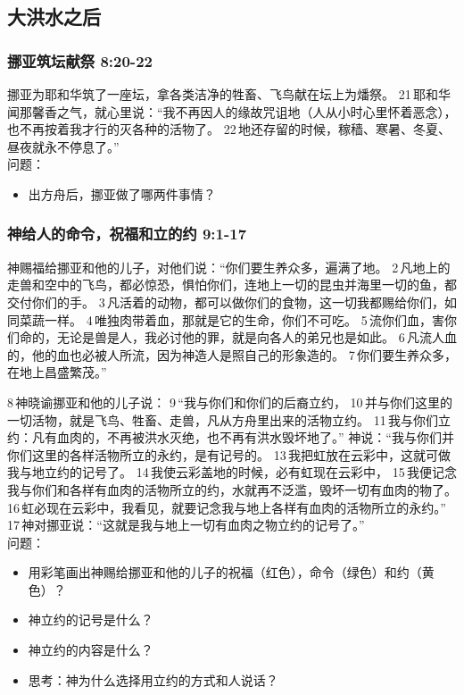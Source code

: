 \subsection{大洪水之后}

\subsubsection{挪亚筑坛献祭 8:20-22}
挪亚为耶和华筑了一座坛，拿各类洁净的牲畜、飞鸟献在坛上为燔祭。 21 耶和华闻那馨香之气，就心里说：“我不再因人的缘故咒诅地（人从小时心里怀着恶念），也不再按着我才行的灭各种的活物了。 22 地还存留的时候，稼穑、寒暑、冬夏、昼夜就永不停息了。”\\

问题：
\begin{itemize}
\item 出方舟后，挪亚做了哪两件事情？
\end{itemize}

\subsubsection{神给人的命令，祝福和立的约 9:1-17}
神赐福给挪亚和他的儿子，对他们说：“你们要生养众多，遍满了地。 2 凡地上的走兽和空中的飞鸟，都必惊恐，惧怕你们，连地上一切的昆虫并海里一切的鱼，都交付你们的手。 3 凡活着的动物，都可以做你们的食物，这一切我都赐给你们，如同菜蔬一样。 4 唯独肉带着血，那就是它的生命，你们不可吃。 5 流你们血，害你们命的，无论是兽是人，我必讨他的罪，就是向各人的弟兄也是如此。 6 凡流人血的，他的血也必被人所流，因为神造人是照自己的形象造的。 7 你们要生养众多，在地上昌盛繁茂。”

8 神晓谕挪亚和他的儿子说： 9 “我与你们和你们的后裔立约， 10 并与你们这里的一切活物，就是飞鸟、牲畜、走兽，凡从方舟里出来的活物立约。 11 我与你们立约：凡有血肉的，不再被洪水灭绝，也不再有洪水毁坏地了。” 神说：“我与你们并你们这里的各样活物所立的永约，是有记号的。 13 我把虹放在云彩中，这就可做我与地立约的记号了。 14 我使云彩盖地的时候，必有虹现在云彩中， 15 我便记念我与你们和各样有血肉的活物所立的约，水就再不泛滥，毁坏一切有血肉的物了。 16 虹必现在云彩中，我看见，就要记念我与地上各样有血肉的活物所立的永约。” 17 神对挪亚说：“这就是我与地上一切有血肉之物立约的记号了。”\\

问题：
\begin{itemize}
\item 用彩笔画出神赐给挪亚和他的儿子的祝福（红色），命令（绿色）和约（黄色）？
\item 神立约的记号是什么？
\item 神立约的内容是什么？
\item 思考：神为什么选择用立约的方式和人说话？
\end{itemize}



